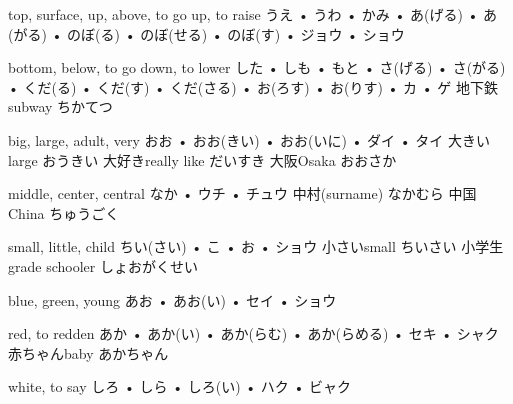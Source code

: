 



\setcounter{cardnum}{57}

		{top, surface, up, above, to go up, to raise}
		{うえ • うわ • かみ • あ(げる) • あ(がる) • のぼ(る) • のぼ(せる) • のぼ(す) • ジョウ • ショウ}
		{}{}
		{}{}
		{}{}
		{}{}
		{}{}

		{bottom, below, to go down, to lower}
		{した • しも • もと • さ(げる) • さ(がる) • くだ(る) • くだ(す) • くだ(さる) • お(ろす) • お(りす) • カ • ゲ}
		{地下鉄}{subway ちかてつ}
		{}{}
		{}{}
		{}{}
		{}{}

		{big, large, adult, very}
		{おお • おお(きい) • おお(いに) • ダイ • タイ}
		{大きい}{large おうきい}
		{大好き}{really like だいすき}
		{大阪}{Osaka おおさか}
		{}{}
		{}{}

		{middle, center, central}
		{なか • ウチ • チュウ}
		{中村}{(surname) なかむら}
		{中国}{China ちゅうごく}
		{}{}
		{}{}
		{}{}

		{small, little, child}
		{ちい(さい) • こ • お • ショウ}
		{小さい}{small ちいさい}
		{小学生}{grade schooler しょおがくせい}
		{}{}
		{}{}
		{}{}

		{blue, green, young}
		{あお • あお(い) • セイ • ショウ}
		{}{}
		{}{}
		{}{}
		{}{}
		{}{}

		{red, to redden}
		{あか • あか(い) • あか(らむ) • あか(らめる) • セキ • シャク}
		{赤ちゃん}{baby あかちゃん}
		{}{}
		{}{}
		{}{}
		{}{}

		{white, to say}
		{しろ • しら • しろ(い) • ハク • ビャク}
		{}{}
		{}{}
		{}{}
		{}{}
		{}{}

